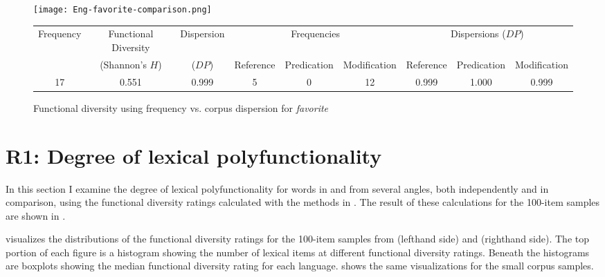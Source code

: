 \begin{landscape}
\thispagestyle{plain}
\begin{figure}

  \centering
  \caption{Functional diversity using frequency vs. corpus dispersion for  \textit{favorite}}
  \label{fig:plot-frequency-vs-dispersion}

  \texttt{[image: Eng-favorite-comparison.png]}

  \begin{tabular}{ c c c c c c c c c }
    \toprule
    Frequency & Functional Diversity & Dispersion & \multicolumn{3}{c}{Frequencies}        & \multicolumn{3}{c}{Dispersions ($DP$)}\\
    { }       & (Shannon's $H$)      & ($DP$)     & Reference & Predication & Modification & Reference & Predication & Modification\\
    \midrule
    17        & 0.551                & 0.999      & 5         & 0           & 12           & 0.999     & 1.000       & 0.999       \\
    \bottomrule
  \end{tabular}

\end{figure}
\end{landscape}

\section{R1: Degree of lexical polyfunctionality}
\label{sec:4.3}

In this section I examine the degree of lexical polyfunctionality for words in  and  from several angles, both independently and in comparison, using the functional diversity ratings calculated with the methods in . The result of these calculations for the 100-item samples are shown in .

 visualizes the distributions of the functional diversity ratings for the 100-item samples from  (lefthand side) and  (righthand side). The top portion of each figure is a histogram showing the number of lexical items at different functional diversity ratings. Beneath the histograms are boxplots showing the median functional diversity rating for each language.  shows the same visualizations for the small corpus samples.

